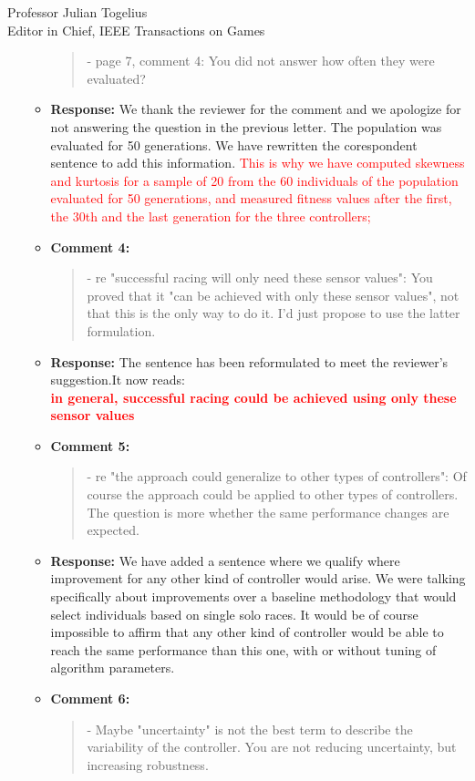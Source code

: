 \documentclass[10pt]{letter} %
\begin{document}
\begin{letter}{Professor Julian Togelius \\ Editor in Chief, IEEE Transactions on Games}
\begin{enumerate}
\begin{itemize}
				\begin{quote}	
					- page 7, comment 4: You did not answer how often they were evaluated?
				\end{quote}	
			\item {\bf Response:} 
			We thank the reviewer for the comment and we apologize for not answering the question in the previous letter. The population was evaluated for 50 generations. We have rewritten the corespondent sentence to add this information.
			\textcolor{red}{This is why we have computed skewness and kurtosis for a sample of 20 from the 60 individuals of the population evaluated for 50 generations, and measured fitness values after the first, the 30th and the last generation for the three controllers;}
			
			\item {\bf Comment 4:}
				\begin{quote}	
					- re "successful racing will only need these sensor values": You proved that it "can be achieved with only these sensor values", not that this is the only way to do it. I'd just propose to use the latter formulation.
				\end{quote}	
			\item{\bf Response:} 
				The sentence has been reformulated to meet the reviewer's suggestion.It now reads:\\
			 \textcolor{red}{	{\bf in general, successful racing could be achieved using only these sensor values} }
			\item {\bf Comment 5:}
				\begin{quote}	
					- re "the approach could generalize to other types of controllers": Of course the approach could be applied to other types of controllers. The question is more whether the same performance changes are expected.
				\end{quote}	
			\item {\bf Response:} 
We have added a sentence where we qualify where improvement for any
other kind of controller would arise. We were talking specifically
about improvements over a baseline methodology that would select
individuals based on single solo races. It would be of course
impossible to affirm that any other kind of controller would be able
to reach the same performance than this one, with or without tuning of
algorithm parameters.
			\item {\bf Comment 6:}
				\begin{quote}	
					- Maybe "uncertainty" is not the best term to describe the variability of the controller. You are not reducing uncertainty, but increasing robustness.

\end{quote}
\end{itemize}
\end{enumerate}
\end{letter}
\end{document}
